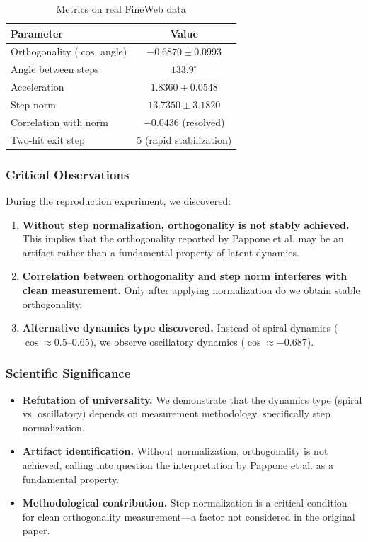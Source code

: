 \documentclass[12pt,a4paper]{article}
\begin{document}
\begin{table}[h]
\centering
\caption{Metrics on real FineWeb data}
\begin{tabular}{lc}
\toprule
Parameter & Value \\
\midrule
Orthogonality ($\cos$ angle) & $-0.6870 \pm 0.0993$ \\
Angle between steps & $133.9^\circ$ \\
Acceleration & $1.8360 \pm 0.0548$ \\
Step norm & $13.7350 \pm 3.1820$ \\
Correlation with norm & $-0.0436$ (resolved) \\
Two-hit exit step & 5 (rapid stabilization) \\
\bottomrule
\end{tabular}
\end{table}

\subsubsection{Critical Observations}

During the reproduction experiment, we discovered:

\begin{enumerate}
    \item \textbf{Without step normalization, orthogonality is not stably achieved.} This implies that the orthogonality reported by Pappone et al. may be an artifact rather than a fundamental property of latent dynamics.
    \item \textbf{Correlation between orthogonality and step norm interferes with clean measurement.} Only after applying normalization do we obtain stable orthogonality.
    \item \textbf{Alternative dynamics type discovered.} Instead of spiral dynamics ($\cos \approx 0.5$--0.65), we observe oscillatory dynamics ($\cos \approx -0.687$).
\end{enumerate}

\subsubsection{Scientific Significance}

\begin{itemize}
    \item \textbf{Refutation of universality.} We demonstrate that the dynamics type (spiral vs. oscillatory) depends on measurement methodology, specifically step normalization.
    \item \textbf{Artifact identification.} Without normalization, orthogonality is not achieved, calling into question the interpretation by Pappone et al. as a fundamental property.
    \item \textbf{Methodological contribution.} Step normalization is a critical condition for clean orthogonality measurement—a factor not considered in the original paper.
\end{itemize}
\end{document}
